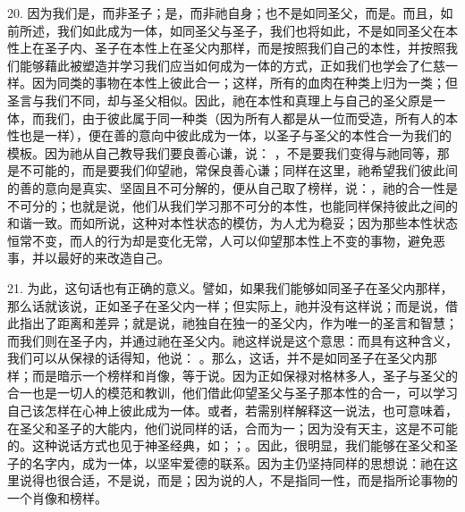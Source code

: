 20. 因为我们是，而非圣子；是，而非祂自身；也不是如同圣父，而是。而且，如前所述，我们如此成为一体，如同圣父与圣子，我们也将如此，不是如同圣父在本性上在圣子内、圣子在本性上在圣父内那样，而是按照我们自己的本性，并按照我们能够藉此被塑造并学习我们应当如何成为一体的方式，正如我们也学会了仁慈一样。因为同类的事物在本性上彼此合一；这样，所有的血肉在种类上归为一类；但圣言与我们不同，却与圣父相似。因此，祂在本性和真理上与自己的圣父原是一体，而我们，由于彼此属于同一种类（因为所有人都是从一位而受造，所有人的本性也是一样），便在善的意向中彼此成为一体，以圣子与圣父的本性合一为我们的模板。因为祂从自己教导我们要良善心谦，说： ，不是要我们变得与祂同等，那是不可能的，而是要我们仰望祂，常保良善心谦；同样在这里，祂希望我们彼此间的善的意向是真实、坚固且不可分解的，便从自己取了榜样，说：，祂的合一性是不可分的；也就是说，他们从我们学习那不可分的本性，也能同样保持彼此之间的和谐一致。而如所说，这种对本性状态的模仿，为人尤为稳妥；因为那些本性状态恒常不变，而人的行为却是变化无常，人可以仰望那本性上不变的事物，避免恶事，并以最好的来改造自己。\par

21. 为此，这句话也有正确的意义。譬如，如果我们能够如同圣子在圣父内那样，那么话就该说，正如圣子在圣父内一样；但实际上，祂并没有这样说；而是说，借此指出了距离和差异；就是说，祂独自在独一的圣父内，作为唯一的圣言和智慧；而我们则在圣子内，并通过祂在圣父内。祂这样说是这个意思：而具有这种含义，我们可以从保禄的话得知，他说： 。那么，这话，并不是如同圣子在圣父内那样；而是暗示一个榜样和肖像，等于说。因为正如保禄对格林多人，圣子与圣父的合一也是一切人的模范和教训，他们借此仰望圣父与圣子那本性的合一，可以学习自己该怎样在心神上彼此成为一体。或者，若需别样解释这一说法，也可意味着，在圣父和圣子的大能内，他们说同样的话，合而为一；因为没有天主，这是不可能的。这种说话方式也见于神圣经典，如；；。因此，很明显，我们能够在圣父和圣子的名字内，成为一体，以坚牢爱德的联系。因为主仍坚持同样的思想说：祂在这里说得也很合适，不是说，而是；因为说的人，不是指同一性，而是指所论事物的一个肖像和榜样。\par

